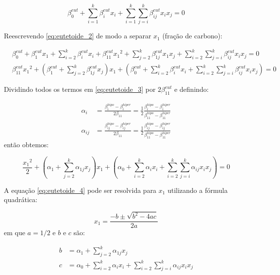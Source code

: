 \documentclass{article}
\begin{document}
\begin{equation}
	\beta_0^{eut} + \sum_{i=1}^k \beta_i^{eut} x_i 
	+ \sum_{i=1}^{k} \sum_{j=i}^k \beta_{ij}^{eut} x_i x_j = 0
	\label{eq:eutetoide_2}
\end{equation}

Reescrevendo \ref{eq:eutetoide_2} de modo a separar $x_1$ (fração de carbono):

\begin{align}
	&\beta_0^{eut} 
	+ \beta_1^{eut} x_ 1 
	+ \sum_{i=2}^k \beta_i^{eut} x_i 
	+ \beta_{11}^{eut} {x_1}^2 
	+ \sum_{j=2}^k \beta_{1j}^{eut} x_1 x_j
	+ \sum_{i=2}^{k} \sum_{j=i}^k \beta_{ij}^{eut} x_i x_j = 0 \nonumber \\
	&\beta_{11}^{eut} {x_1}^2 
	+ \left(\beta_1^{eut} + \sum_{j=2}^k \beta_{1j}^{eut} x_j \right) x_1 
	+ \left(\beta_0^{eut} 
	+ \sum_{i=2}^k \beta_i^{eut} x_i 
	+ \sum_{i=2}^{k} \sum_{j=i}^k \beta_{ij}^{eut} x_i x_j\right) = 0 \label{eq:eutetoide_3}
\end{align}

Dividindo todos os termos em \ref{eq:eutetoide_3} por $2 \beta_{11}^{eut}$ e definindo:

\begin{align}
	\alpha_i 
	&= \frac{\beta_i^{hipo} - \beta_i^{hiper}}{2 \beta_{11}}
	= \frac{1}{2} \frac{\beta_i^{hipo} - \beta_i^{hiper}}{\beta_{11}^{hipo} - \beta_{11}^{hiper}}\\
	\alpha_{ij} 
	&= \frac{\beta_{ij}^{hipo} - \beta_{ij}^{hiper}}{2 \beta_{11}}
	= \frac{1}{2} \frac{\beta_{ij}^{hipo} - \beta_{ij}^{hiper}}{\beta_{11}^{hipo} - \beta_{11}^{hiper}}
\end{align}
%
então obtemos:

\begin{equation}
	\frac{{x_1}^2}{2}
	+ \left(\alpha_1 + \sum_{j=2}^k \alpha_{1j} x_j \right) x_1 
	+ \left(\alpha_0 
	+ \sum_{i=2}^k \alpha_i x_i 
	+ \sum_{i=2}^{k} \sum_{j=i}^k \alpha_{ij} x_i x_j\right) = 0 \label{eq:eutetoide_4}
\end{equation}

A equação \ref{eq:eutetoide_4} pode ser resolvida para $x_1$ utilizando a fórmula quadrática:

\begin{equation}
	x_1 = \frac{-b \pm \sqrt{b^2 - 4 a c}}{2 a}
	\label{eq:quadratica}
\end{equation}
%
em que $a = 1/2$ e $b$ e $c$ são:

\begin{align}
	b &= \alpha_1 + \sum_{j=2}^k \alpha_{1j} x_j \\
	c &= \alpha_0 
	+ \sum_{i=2}^k \alpha_i x_i 
	+ \sum_{i=2}^{k} \sum_{j=i}^k \alpha_{ij} x_i x_j
\end{align}
\end{document}
